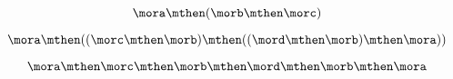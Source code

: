 {\begin{forslides}
  \begin{equation}\label{eq:12}
 \mora \mthen  (\morb \mthen \morc )
 \end{equation}
 
 \begin{equation}\label{eq:13}
 \mora \mthen  ((\morc \mthen \morb ) \mthen (( \mord \mthen \morb ) \mthen \mora ))
 \end{equation}
 
 \begin{equation}\label{eq:14}
 \mora \mthen  \morc \mthen \morb  \mthen \mord \mthen \morb  \mthen \mora
 \end{equation}

 


  \end{forslides}}
